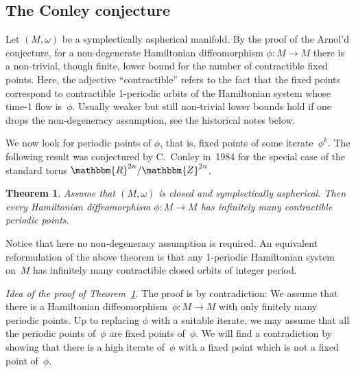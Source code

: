\documentclass[12pt,twoside]{amsart}
\theoremstyle{plain}
\newtheorem{theorem}{Theorem}[section]
\numberwithin{figure}{section}
\numberwithin{equation}{section}
\def\go{\omega}
\def\RR{\mathbbm{R}}
\def\ZZ{\mathbbm{Z}}
\def\ni{\noindent}
\begin{document}
 

\subsection{The Conley conjecture}

Let $(M,\go)$ be a symplectically aspherical manifold.
By the proof of the Arnol'd conjecture, 
for a non-degenerate Hamiltonian diffeomorphism $\phi \colon M \rightarrow M$ 
there is a non-trivial, though finite, lower bound for the number of contractible fixed points. 
Here, the adjective ``contractible'' refers to the fact that the fixed points correspond to contractible 1-periodic orbits of the Hamiltonian system whose time-1 flow is~$\phi$. 
Usually weaker but still non-trivial lower bounds hold if one drops the non-degeneracy assumption, see the historical notes below.

We now look for periodic points of $\phi$, that is, fixed points of some iterate~$\phi^k$.
The following result was conjectured by C.\ Conley in~1984
for the special case of the standard torus $\RR^{2n} / \ZZ^{2n}$.

\begin{theorem} \label{t:Conley}
Assume that $(M,\go)$ is closed and symplectically aspherical. 
Then every Hamiltonian diffeomorphism $\phi \colon M \rightarrow M$ has infinitely many 
contractible periodic points.
\end{theorem}

Notice that here no non-degeneracy assumption is required. An equivalent reformulation 
of the above theorem is that any 1-periodic Hamiltonian system on~$M$ has infinitely many contractible closed orbits of integer period.


\medskip
\ni
{\it Idea of the proof of Theorem~\ref{t:Conley}.}
The proof is by contradiction: We assume that there is a Hamiltonian diffeomorphism~$\phi \colon M \rightarrow M$ with only finitely many periodic points. 
Up to replacing $\phi$ with a suitable iterate, we may assume that all the periodic points 
of~$\phi$ are fixed points of~$\phi$. We will find a contradiction by showing that there is 
a high iterate of~$\phi$ with a fixed point which is not a fixed point of~$\phi$.
\end{document}
